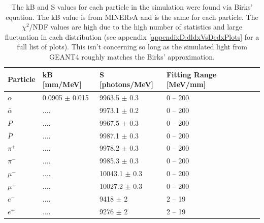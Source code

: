 \begin{table}[!h]
\centering
\begin{tabular}{lllll}  
\toprule
Particle       & kB [mm/MeV]        & S [photons/MeV]   & Fitting Range [MeV/mm]\\ %
\midrule
$\alpha$       & 0.0905 $\pm$ 0.015 & 9963.5  $\pm$ 0.3 & 0 -- 200\\               %
$\bar{\alpha}$ & ....               & 9973.1  $\pm$ 0.2 & 0 -- 200\\               %
$P$            & ....               & 9967.5  $\pm$ 0.3 & 0 -- 200\\               %
$\bar{P}$      & ....               & 9987.1  $\pm$ 0.3 & 0 -- 200\\               %
$\pi^+$        & ....               & 9978.2  $\pm$ 0.3 & 0 -- 200\\               %
$\pi^-$        & ....               & 9985.3  $\pm$ 0.3 & 0 -- 200\\               %
$\mu^-$        & ....               & 10043.1 $\pm$ 0.3 & 0 -- 200\\               %
$\mu^+$        & ....               & 10027.2 $\pm$ 0.3 & 0 -- 200\\               %
$e^-$          & ....               & 9418    $\pm$ 2   & 2 -- 19 \\               %
$e^+$          & ....               & 9276    $\pm$ 2   & 2 -- 19 \\               %
\bottomrule  
\end{tabular}
\caption{The kB and S values for each particle in the simulation were found via Birks' equation. The kB value is from MINER$\nu$A and is the same for each particle. The $\chi^2$/NDF values are high due to the high number of statistics and large fluctuation in each distribution (see appendix  \ref{appendixD:dldxVsDedxPlots} for a full list of plots). This isn't concerning so long as the simulated light from GEANT4 roughly matches the Birks' approximation.}
\label{tab:sValueTable}
\end{table}

